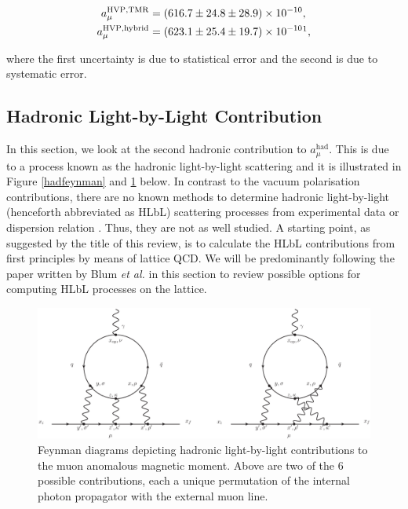 \documentclass{article}
\numberwithin{equation}{section} %
\begin{document}
\begin{equation}
\begin{split}
a_\mu^\mathrm{HVP,TMR} &= (616.7 \pm 24.8 \pm 28.9) \times 10^{-10} ,\\
a_\mu^\mathrm{HVP,hybrid}&= (623.1 \pm 25.4 \pm 19.7) \times 10^{-10}\footnotemark , 
\end{split}
\end{equation}

\noindent where the first uncertainty is due to statistical error and the second is due to systematic error. 



\subsection{Hadronic Light-by-Light Contribution}

In this section, we look at the second hadronic contribution to $a_\mu^\mathrm{had}$. This is due to a process known as the hadronic light-by-light scattering and it is illustrated in Figure \ref{hadfeynman} and \ref{hadlbl} below. In contrast to the vacuum polarisation contributions, there are no known methods to determine hadronic light-by-light (henceforth abbreviated as HLbL) scattering processes from experimental data or dispersion relation \cite{blum}. Thus, they are not as well studied. A starting point, as suggested by the title of this review, is to calculate the HLbL contributions from first principles by means of lattice QCD. We will be predominantly following the paper written by Blum \textit{et al.}\cite{blum} in this section to review possible options for computing HLbL processes on the lattice.

\begin{figure}[t]
    \centering
    \includegraphics[scale=0.45]{hlblnotated.eps}%
    \caption{Feynman diagrams depicting hadronic light-by-light contributions to the muon anomalous magnetic moment. Above are two of the 6 possible contributions, each a unique permutation of the internal photon propagator with the external muon line.}%
    \label{hadlbl}%
\end{figure}
\end{document}
